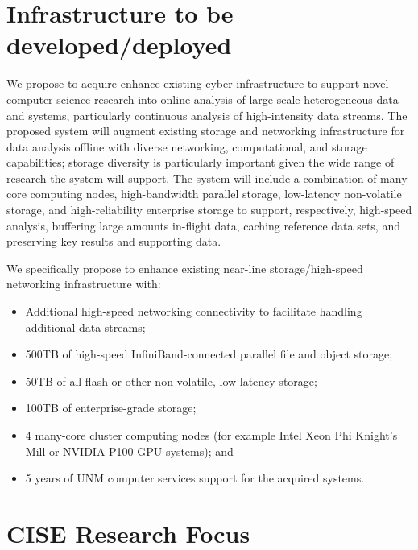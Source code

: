 \documentclass[11pt]{article}
\begin{document}
\vspace*{0.1in}

\vspace*{0.1in}

\vspace*{0.1in}
\section{Infrastructure to be developed/deployed}

We propose to acquire enhance existing cyber-infrastructure to support novel computer science research 
into online analysis of large-scale heterogeneous data and systems, particularly continuous
analysis of high-intensity data streams. The proposed system will augment existing storage and networking
infrastructure for data analysis offline with diverse networking, computational, and storage capabilities; 
storage diversity is particularly important given the wide range of research the system will support. 
The system will include a combination of many-core computing nodes, high-bandwidth parallel storage, 
low-latency non-volatile storage, and high-reliability enterprise storage to support, respectively,
high-speed analysis, buffering large amounts in-flight data, caching reference data sets, and preserving 
key results and supporting data. 

We specifically propose to enhance existing near-line storage/high-speed networking
infrastructure with:
\begin{itemize}
\item Additional high-speed networking connectivity to facilitate handling additional data streams;
\item 500TB of high-speed InfiniBand-connected parallel file and object storage;
\item 50TB of all-flash or other non-volatile, low-latency storage;
\item 100TB of enterprise-grade storage;
\item 4 many-core cluster computing nodes (for example Intel Xeon Phi Knight's Mill or NVIDIA P100 GPU systems); and
\item 5 years of UNM computer services support for the acquired systems.
\end{itemize}

\section{CISE Research Focus}
\end{document}
